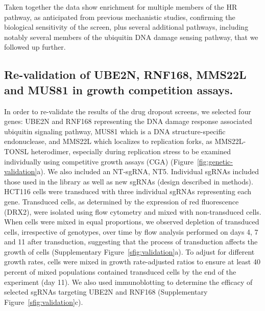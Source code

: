 Taken together the data show enrichment for multiple members of the HR pathway, as anticipated from previous mechanistic studies, confirming the biological sensitivity of the screen, plus several additional pathways, including notably several members of the ubiquitin DNA damage sensing pathway, that we followed up further.

\subsection{Re-validation of UBE2N, RNF168, MMS22L and MUS81 in growth competition assays.}
In order to re-validate the results of the drug dropout screens, we selected four genes: UBE2N and RNF168 representing the DNA damage response associated ubiquitin signaling pathway, MUS81 which is a DNA structure-specific endonuclease, and MMS22L which localizes to replication forks, as MMS22L-TONSL heterodimer, especially during replication stress\cite{Piwko2016} to be examined individually using competitive growth assays (CGA) (Figure~\ref{fig:genetic-validation}a). We also included an NT-sgRNA, NT5. Individual sgRNAs included those used in the library as well as new sgRNAs (design described in methods). HCT116 cells were transduced with three individual sgRNAs representing each gene. Transduced cells, as determined by the expression of red fluorescence (DRX2), were isolated using flow cytometry and mixed with non-transduced cells. When cells were mixed in equal proportions, we observed depletion of transduced cells, irrespective of genotypes, over time by flow analysis performed on days 4, 7 and 11 after transduction, suggesting that the process of transduction affects the growth of cells (Supplementary Figure~\ref{sfig:validation}a). To adjust for different growth rates, cells were mixed in growth rate-adjusted ratios to ensure at least 40 percent of mixed populations contained transduced cells by the end of the experiment (day 11). We also used immunoblotting to determine the efficacy of selected sgRNAs targeting UBE2N and RNF168 (Supplementary Figure~\ref{sfig:validation}c).

